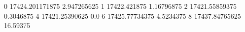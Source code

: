 0 17424.201171875 2.947265625
1 17422.421875 1.16796875
2 17421.55859375 0.3046875
4 17421.25390625 0.0
6 17425.77734375 4.5234375
8 17437.84765625 16.59375
